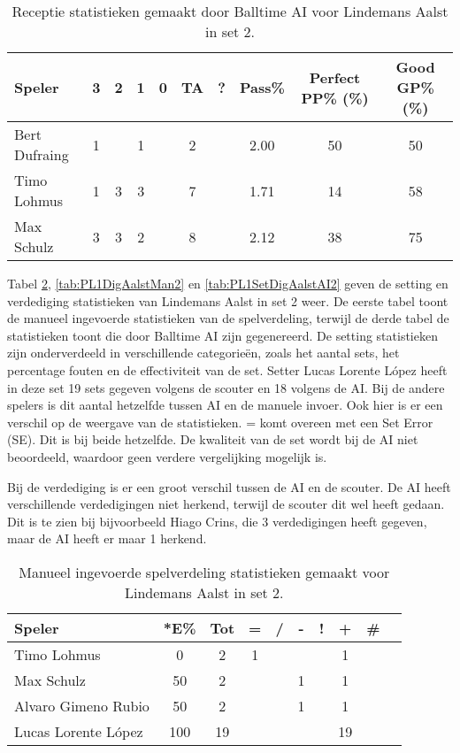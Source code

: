 \begin{table}[ht!]
  \centering
  \scriptsize
  \begin{tabular}{|l|c|c|c|c|c|c|c|c|c|} \hline
    \textbf{Speler} & 3 & 2 & 1 & 0 & TA & ? & Pass\% & Perfect PP\% (\%) & Good GP\% (\%) \\ \hline
    Bert Dufraing & 1 &  & 1 &  & 2 &  & 2.00 & 50 & 50 \\
    Timo Lohmus & 1 & 3 & 3 &  & 7 &  & 1.71 & 14 & 58 \\
    Max Schulz & 3 & 3 & 2 &  & 8 &  & 2.12 & 38 & 75 \\  \hline
  \end{tabular}
  \caption[Receptie statistieken gemaakt door Balltime AI voor Lindemans Aalst in set 2]{\label{tab:PL1ReceiveAalstAI2}Receptie statistieken gemaakt door Balltime AI voor Lindemans Aalst in set 2.}
\end{table}

Tabel \ref{tab:PL1SetAalstMan2}, \ref{tab:PL1DigAalstMan2} en \ref{tab:PL1SetDigAalstAI2} geven de setting en verdediging statistieken van Lindemans Aalst in set 2 weer. De eerste tabel toont de manueel ingevoerde statistieken van de spelverdeling, terwijl de derde tabel de statistieken toont die door Balltime AI zijn gegenereerd. De setting statistieken zijn onderverdeeld in verschillende categorieën, zoals het aantal sets, het percentage fouten en de effectiviteit van de set. Setter Lucas Lorente López heeft in deze set 19 sets gegeven volgens de scouter en 18 volgens de AI. Bij de andere spelers is dit aantal hetzelfde tussen AI en de manuele invoer. Ook hier is er een verschil op de weergave van de statistieken. = komt overeen met een Set Error (SE). Dit is bij beide hetzelfde. De kwaliteit van de set wordt bij de AI niet beoordeeld, waardoor geen verdere vergelijking mogelijk is.

Bij de verdediging is er een groot verschil tussen de AI en de scouter. De AI heeft verschillende verdedigingen niet herkend, terwijl de scouter dit wel heeft gedaan. Dit is te zien bij bijvoorbeeld Hiago Crins, die 3 verdedigingen heeft gegeven, maar de AI heeft er maar 1 herkend.

\begin{table}[ht!]
  \centering
  \scriptsize
    \begin{tabular}{|l|c|c|c|c|c|c|c|c|c|} \hline
      \textbf{Speler} & *E\% & Tot & = & / & - & ! & + & \# \\ \hline
      Timo Lohmus & 0 & 2 & 1 &  &  &  & 1 &   \\
      Max Schulz & 50 & 2 &  &  & 1 & & 1 &  \\
      Alvaro Gimeno Rubio  & 50 & 2 &  &  & 1 &  & 1 &   \\ 
      Lucas Lorente López  & 100 & 19 &  &  &  &  & 19 &  \\ \hline
  \end{tabular}
  \caption[Manueel ingevoerde spelverdeling statistieken gemaakt voor Lindemans Aalst in set 2]{\label{tab:PL1SetAalstMan2}Manueel ingevoerde spelverdeling statistieken gemaakt voor Lindemans Aalst in set 2.}
\end{table}

